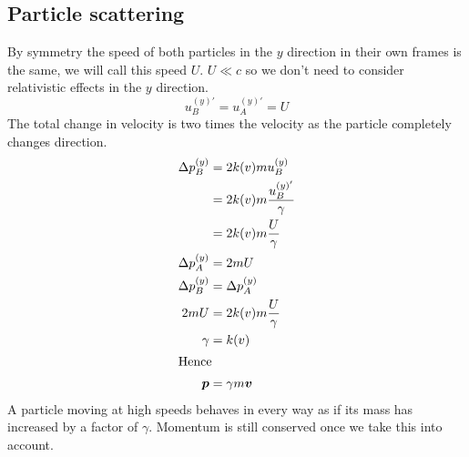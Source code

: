 \documentclass{article}
\begin{document}
    \subsection{Particle scattering}
    By symmetry the speed of both particles in the \(y\) direction in their own frames is the same, we will call this speed \(U\).
    \(U\ll c\) so we don't need to consider relativistic effects in the \(y\) direction.
    \[u_B^{(y)'} = u_A^{(y)'} = U\]
    The total change in velocity is two times the velocity as the particle completely changes direction.
    \begin{align*}
        \Delta p_B^{(y)} &= 2k(v)mu_B^{(y)}\\
        &= 2k(v)m\frac{u_B^{(y)'}}{\gamma}\\
        &= 2k(v)m\frac{U}{\gamma}\\
        \Delta p_A^{(y)} &= 2mU\\
        \Delta p_B^{(y)} &= \Delta p_A^{(y)}\\
        2mU &= 2k(v)m\frac{U}{\gamma}\\
        \gamma &= k(v)\\
        \intertext{Hence}
        \bm{p} &= \gamma m\bm{v}
    \end{align*}
    A particle moving at high speeds behaves in every way as if its mass has increased by a factor of \(\gamma\).
    Momentum is still conserved once we take this into account.
    
\end{document}
